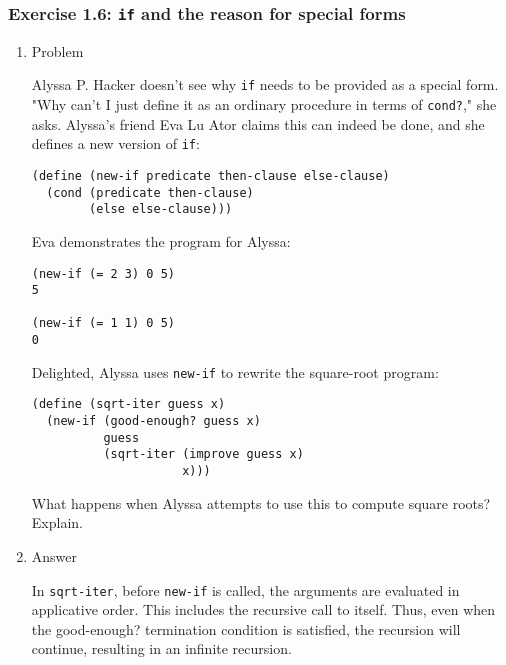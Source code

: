 \documentclass[11pt]{article}
\begin{document}
\subsubsection{Exercise 1.6: \texttt{if} and the reason for special forms}
\label{sec-1-2-1}
\begin{enumerate}
\item Problem
\label{sec-1-2-1-1}

Alyssa P. Hacker doesn't see why \texttt{if} needs to be
provided as a special form.  "Why can't I just define it as an
ordinary procedure in terms of \texttt{cond?}," she asks.  Alyssa's friend
Eva Lu Ator claims this can indeed be done, and she defines a new
version of \texttt{if}:

\begin{verbatim}
(define (new-if predicate then-clause else-clause)
  (cond (predicate then-clause)
        (else else-clause)))
\end{verbatim}

Eva demonstrates the program for Alyssa:

\begin{verbatim}
(new-if (= 2 3) 0 5)
5

(new-if (= 1 1) 0 5)
0
\end{verbatim}

Delighted, Alyssa uses \texttt{new-if} to rewrite the square-root program:

\begin{verbatim}
(define (sqrt-iter guess x)
  (new-if (good-enough? guess x)
          guess
          (sqrt-iter (improve guess x)
                     x)))
\end{verbatim}

What happens when Alyssa attempts to use this to compute square
roots?  Explain.
\item Answer
\label{sec-1-2-1-2}

In \texttt{sqrt-iter}, before \texttt{new-if} is called, the arguments are evaluated
in applicative order. This includes the recursive call to
itself. Thus, even when the good-enough? termination condition is
satisfied, the recursion will continue, resulting in an infinite
recursion.
\end{enumerate}
\end{document}
